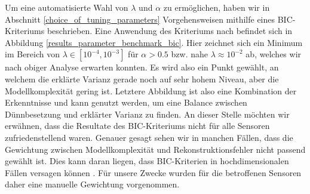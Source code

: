 Um eine automatisierte Wahl von $\lambda$ und $\alpha$ zu ermöglichen, haben wir in Abschnitt \ref{choice_of_tuning_parameters} Vorgehensweisen mithilfe eines BIC-Kriteriums beschrieben. Eine Anwendung des Kriteriums nach \cite{croux, guo} befindet sich in Abbildung \ref{results_parameter_benchmark_bic}. Hier zeichnet sich ein Minimum im Bereich von $\lambda \in [10^{-4}, 10^{-3}]$ für $\alpha > 0.5$ bzw. nahe $\lambda \approx 10^{-2}$ ab, welches wir nach obiger Analyse erwarten konnten. Es wird also ein Punkt gewählt, an welchem die erklärte Varianz gerade noch auf sehr hohem Niveau, aber die Modellkomplexität gering ist. Letztere Abbildung ist also eine Kombination der Erkenntnisse und kann genutzt werden, um eine Balance zwischen Dünnbesetzung und erklärter Varianz zu finden. An dieser Stelle möchten wir erwähnen, dass die Resultate des BIC-Kriteriums nicht für alle Sensoren zufriedenstellend waren. Genauer gesagt sehen wir in manchen Fällen, dass die Gewichtung zwischen Modellkomplexität und Rekonstruktionsfehler nicht passend gewählt ist. Dies kann daran liegen, dass BIC-Kriterien in hochdimensionalen Fällen versagen können \cite{giraud}. Für unsere Zwecke wurden für die betroffenen Sensoren daher eine manuelle Gewichtung vorgenommen.

